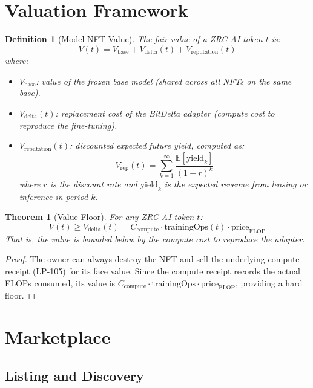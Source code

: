 \documentclass[11pt,letterpaper]{article}
\newtheorem{theorem}{Theorem}[section]
\newtheorem{definition}{Definition}[section]
\begin{document}
\section{Valuation Framework}

\begin{definition}[Model NFT Value]
\label{def:value}
The fair value of a ZRC-AI token $t$ is:
\begin{equation}
V(t) = V_{\text{base}} + V_{\text{delta}}(t) + V_{\text{reputation}}(t)
\end{equation}
where:
\begin{itemize}
    \item $V_{\text{base}}$: value of the frozen base model (shared across all NFTs on the same base).
    \item $V_{\text{delta}}(t)$: replacement cost of the BitDelta adapter (compute cost to reproduce the fine-tuning).
    \item $V_{\text{reputation}}(t)$: discounted expected future yield, computed as:
    \[
    V_{\text{rep}}(t) = \sum_{k=1}^{\infty} \frac{\mathbb{E}[\text{yield}_k]}{(1 + r)^k}
    \]
    where $r$ is the discount rate and $\text{yield}_k$ is the expected revenue from leasing or inference in period $k$.
\end{itemize}
\end{definition}

\begin{theorem}[Value Floor]
\label{thm:floor}
For any ZRC-AI token $t$:
\[
V(t) \geq V_{\text{delta}}(t) = C_{\text{compute}} \cdot \text{trainingOps}(t) \cdot \text{price}_{\text{FLOP}}
\]
That is, the value is bounded below by the compute cost to reproduce the adapter.
\end{theorem}

\begin{proof}
The owner can always destroy the NFT and sell the underlying compute receipt (LP-105) for its face value. Since the compute receipt records the actual FLOPs consumed, its value is $C_{\text{compute}} \cdot \text{trainingOps} \cdot \text{price}_{\text{FLOP}}$, providing a hard floor.
\end{proof}

\section{Marketplace}
\label{sec:marketplace}

\subsection{Listing and Discovery}
\end{document}
